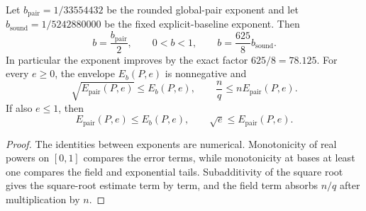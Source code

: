 \begin{theorem}
\label{thm:pauli-final-envelope-support}
\leanok
{}
Let $b_{\mathrm{pair}}=1/33554432$ be the rounded global-pair exponent and
let $b_{\mathrm{sound}}=1/5242880000$ be the fixed explicit-baseline
exponent.  Then
\[
 b=\frac{b_{\mathrm{pair}}}{2},\qquad
 0<b<1,\qquad
 b=\frac{625}{8}b_{\mathrm{sound}}.
\]
In particular the exponent improves by the exact factor $625/8=78.125$.
For every $e\geq0$, the envelope $E_b(P,e)$ is nonnegative and
\[
 \sqrt{E_{\mathrm{pair}}(P,e)}\leq E_b(P,e),\qquad
 \frac{n}{q}\leq nE_{\mathrm{pair}}(P,e).
\]
If also $e\leq1$, then
\[
 E_{\mathrm{pair}}(P,e)\leq E_b(P,e),\qquad
 \sqrt e\leq E_{\mathrm{pair}}(P,e).
\]
\end{theorem}
\begin{proof}
\leanok
{}
The identities between exponents are numerical.  Monotonicity of real powers
on $[0,1]$ compares the error terms, while monotonicity at bases at least one
compares the field and exponential tails.  Subadditivity of the square root
gives the square-root estimate term by term, and the field term absorbs
$n/q$ after multiplication by $n$.
\end{proof}


